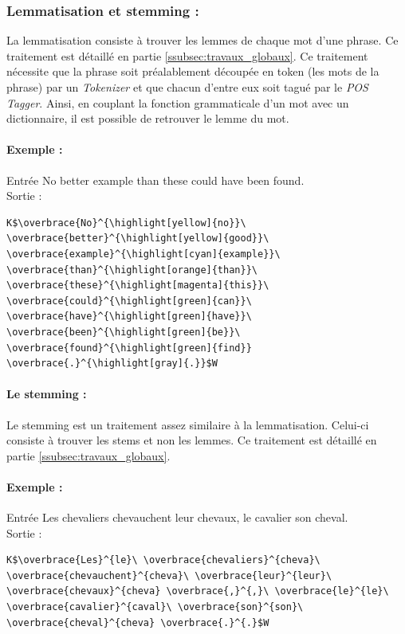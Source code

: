             \subsubsection{Lemmatisation et stemming :}
                La lemmatisation consiste à trouver les lemmes de chaque mot d'une phrase. Ce traitement est détaillé en partie \ref{ssubsec:travaux_globaux}. Ce traitement nécessite que la phrase soit préalablement découpée en token (les mots de la phrase) par un \textit{Tokenizer} et que chacun d'entre eux soit tagué par le \textit{POS Tagger}. Ainsi, en couplant la fonction grammaticale d'un mot avec un dictionnaire, il est possible de retrouver le lemme du mot.

                \paragraph{Exemple :}
                Entrée \og No better example than these could have been found.\fg\\
                Sortie :
\begin{lstlisting}
K$\overbrace{No}^{\highlight[yellow]{no}}\ \overbrace{better}^{\highlight[yellow]{good}}\ \overbrace{example}^{\highlight[cyan]{example}}\ \overbrace{than}^{\highlight[orange]{than}}\ \overbrace{these}^{\highlight[magenta]{this}}\ \overbrace{could}^{\highlight[green]{can}}\ \overbrace{have}^{\highlight[green]{have}}\ \overbrace{been}^{\highlight[green]{be}}\ \overbrace{found}^{\highlight[green]{find}} \overbrace{.}^{\highlight[gray]{.}}$W
\end{lstlisting}

                \paragraph{Le stemming :}
                Le stemming est un traitement assez similaire à la lemmatisation. Celui-ci consiste à trouver les stems et non les lemmes. Ce traitement est détaillé en partie \ref{ssubsec:travaux_globaux}.

                \paragraph{Exemple :}
                Entrée \og Les chevaliers chevauchent leur chevaux, le cavalier son cheval.\fg\\
                Sortie :
\begin{lstlisting}
K$\overbrace{Les}^{le}\ \overbrace{chevaliers}^{cheva}\ \overbrace{chevauchent}^{cheva}\ \overbrace{leur}^{leur}\ \overbrace{chevaux}^{cheva} \overbrace{,}^{,}\ \overbrace{le}^{le}\ \overbrace{cavalier}^{caval}\ \overbrace{son}^{son}\ \overbrace{cheval}^{cheva} \overbrace{.}^{.}$W
\end{lstlisting}

